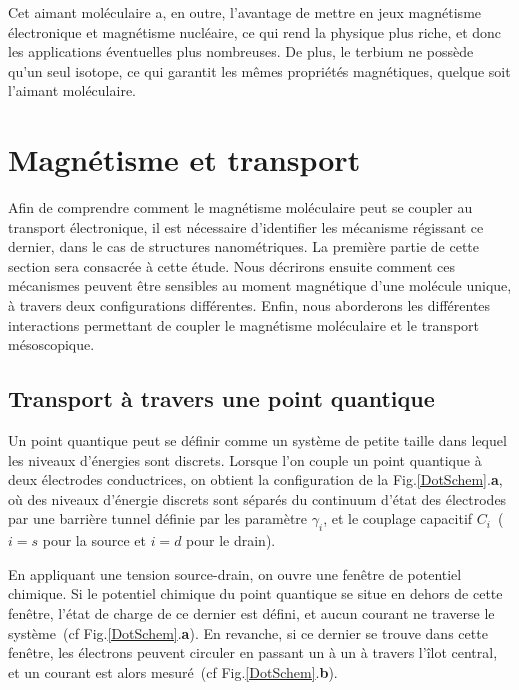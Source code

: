 Cet aimant moléculaire a, en outre, l'avantage de mettre en jeux magnétisme électronique et magnétisme nucléaire, ce qui rend la physique plus riche, et donc les applications éventuelles plus nombreuses. De plus, le terbium ne possède qu'un seul isotope, ce qui garantit les mêmes propriétés magnétiques, quelque soit l'aimant moléculaire.

\section{Magnétisme et transport}
Afin de comprendre comment le magnétisme moléculaire peut se coupler au transport électronique, il est nécessaire d'identifier les mécanisme régissant ce dernier, dans le cas de structures nanométriques. La première partie de cette section sera consacrée à cette étude.
Nous décrirons ensuite comment ces mécanismes peuvent \^etre sensibles au moment magnétique d'une molécule unique, à travers deux configurations différentes. Enfin, nous aborderons les différentes interactions permettant de coupler le magnétisme moléculaire et le transport mésoscopique.

\subsection{Transport à travers une point quantique}
Un point quantique peut se définir comme un système de petite taille dans lequel les niveaux d'énergies sont discrets. Lorsque l'on couple un point quantique à deux électrodes conductrices, on obtient la configuration de la Fig.\ref{DotSchem}.\textbf{a}, où des niveaux d'énergie discrets sont séparés du continuum d'état des électrodes par une barrière tunnel définie par les paramètre $\gamma_i$, et le couplage capacitif $C_i$~($i=s$ pour la source et $i=d$ pour le drain).

En appliquant une tension source-drain, on ouvre une fenêtre de potentiel chimique. Si le potentiel chimique du point quantique se situe en dehors de cette fen\^etre, l'état de charge de ce dernier est défini, et aucun courant ne traverse le système~(cf Fig.\ref{DotSchem}.\textbf{a}). En revanche, si ce dernier se trouve dans cette fen\^etre, les électrons peuvent circuler en passant un à un à travers l'\^ilot central, et un courant est alors mesuré~(cf Fig.\ref{DotSchem}.\textbf{b}). 

